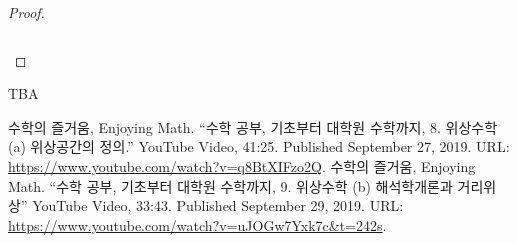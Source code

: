 \documentclass[11pt,openany]{article}
\begin{document}
\begin{note}[]
\begin{proof}
\begin{enumerate}[(1)]
\[	\]
\end{enumerate}
\end{proof}
\end{note}
\begin{note}
	TBA
\end{note}
\vfill

\begin{thebibliography}{9}
	수학의 즐거움, Enjoying Math. ``수학 공부, 기초부터 대학원 수학까지, 8. 위상수학 (a) 위상공간의 정의.'' YouTube Video, 41:25. Published 
	September 27, 2019. URL: \url{https://www.youtube.com/watch?v=q8BtXIFzo2Q}.
	수학의 즐거움, Enjoying Math. ``수학 공부, 기초부터 대학원 수학까지, 9. 위상수학 (b) 해석학개론과 거리위상'' YouTube Video, 33:43. Published 
	September 29, 2019. URL: \url{https://www.youtube.com/watch?v=uJOGw7Yxk7c&t=242s}.
\end{thebibliography}
\end{document}
